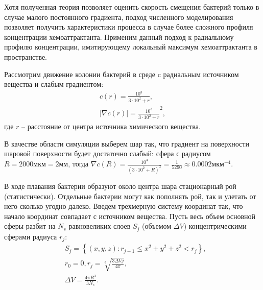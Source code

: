 Хотя полученная теория позволяет оценить скорость смещения бактерий только в случае малого постоянного градиента, подход численного моделирования позволяет получить характеристики процесса в случае более сложного профиля концентрации хемоаттрактанта. Применим данный подход к радиальному профилю концентрации, имитирующему локальный максимум хемоаттрактанта в пространстве. 

Рассмотрим движение колонии бактерий в среде c радиальным источником вещества и слабым градиентом:
\begin{equation}
    \begin{aligned}
        c(r)=\frac{10^3}{3 \cdot 10^2+r},\\
        |\nabla c(r)|=\frac{10^3}{3 \cdot 10^2+r}^2,
    \label{eq:radial-chem}
    \end{aligned}
\end{equation}
где $r$ -- расстояние от центра источника химического вещества.

В качестве области симуляции выберем шар так, что градиент на поверхности шаровой поверхности будет достаточно слабый: сфера с радиусом $R=2000 \textrm{мкм}=2 \textrm{мм}$, тогда $\nabla c(R)=\frac{10^3}{(3 \cdot 10^2+R)^2} = \frac{1}{5290} \approx 0.0002 \textrm{мкм}^{-4}$.

В ходе плавания бактерии образуют около центра шара стационарный рой (статистически). Отдельные бактерии могут как пополнять рой, так и улетать от него сколько угодно далеко. Введем трехмерную систему координат так, что начало координат совпадает с источником вещества. Пусть весь объем основной сферы разбит на $N_{s}$ равновеликих слоев $S_j$ (объемом $\Delta V$) концентрическими сферами радиуса $r_j$:
\begin{equation}
    \begin{aligned}
        &S_j=\left \{(x,y,z) : r_{j-1} \leq x^2+y^2+z^2<r_j \right \},\\
        &r_0=0, r_j=\sqrt[3]{\frac{3\Delta V j}{4\pi}},\\
        &\Delta V=\frac{4 \pi R^3}{3 N_s}.
    \label{eq:radial-spheres}
    \end{aligned}
\end{equation}

